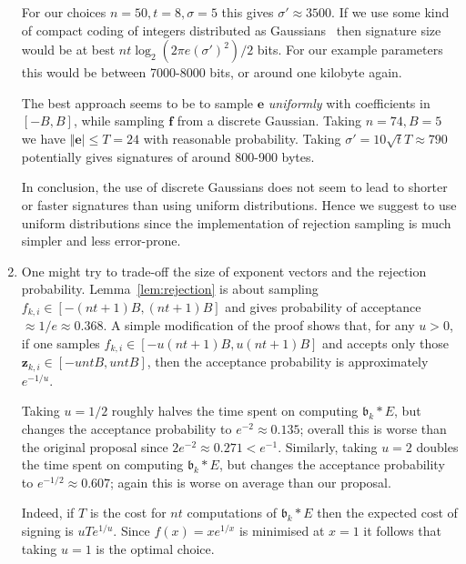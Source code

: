 \documentclass{llncs}
\renewcommand{\b}{\mathfrak{b}}
\newcommand{\e}{\mathbf{e}}
\newcommand{\f}{\mathbf{f}}
\newcommand{\z}{\mathbf{z}}
\begin{document}
\begin{enumerate}
For our choices $n=50, t = 8, \sigma = 5$ this gives $\sigma' \approx 3500$.
If we use some kind of compact coding of integers distributed as Gaussians~\cite{DDLL13} then signature size would be at best $nt \log_2( 2 \pi e (\sigma')^2 )/2$ bits.
For our example parameters this would be between 7000-8000 bits, or around one kilobyte again.

The best approach seems to be to sample $\e$ \emph{uniformly} with coefficients in $[-B, B]$, while sampling $\f$ from a discrete Gaussian. Taking $n=74, B = 5$ we have $\Vert \e \vert \le T = 24$ with reasonable probability. Taking $\sigma' = 10 \sqrt{t} T \approx 790$ potentially gives signatures of around 800-900 bytes.

In conclusion, the use of discrete Gaussians does not seem to lead to shorter or faster signatures than using uniform distributions. Hence we suggest to use uniform distributions since the implementation of rejection sampling is much simpler and less error-prone.


\item One might try to trade-off the size of exponent vectors and the rejection probability. Lemma~\ref{lem:rejection} is about sampling $f_{k,i} \in [ -(nt+1)B, (nt+1)B ]$ and gives probability of acceptance $\approx 1/e \approx 0.368$.
A simple modification of the proof shows that, for any $u > 0$, if one samples $f_{k,i} \in [ -u(nt+1)B, u(nt+1)B ]$ and accepts only those $\z_{k,i} \in [ -untB, untB ]$, then the acceptance probability is approximately $e^{-1/u}$.

Taking $u = 1/2$ roughly halves the time spent on computing $\b_k * E$, but changes the acceptance probability to $e^{-2}  \approx 0.135$; overall this is worse than the original proposal since $2 e^{-2} \approx 0.271 < e^{-1}$.
Similarly, taking $u = 2$ doubles the time spent on computing $\b_k * E$, but changes the acceptance probability to $e^{-1/2} \approx 0.607$; again this is worse on average than our proposal.

Indeed, if $T$ is the cost for $nt$ computations of $\b_k * E$ then the expected cost of signing is $u T e^{1/u}$. Since $f(x) = x e^{1/x}$ is minimised at $x=1$ it follows that taking $u=1$ is the optimal choice.

\end{enumerate}
\end{document}
